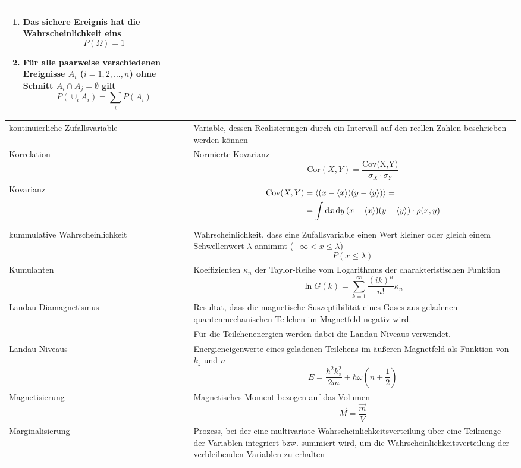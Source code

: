 \documentclass{article}
\newcommand{\diff}{\mathrm{d}}
\newcommand{\lr}[1]{\left(#1\right)}
\begin{document}
\begin{xltabular}{\linewidth}{p{6cm}|X}
{\begin{enumerate}
			\item Das sichere Ereignis hat die Wahrscheinlichkeit eins
				$$P(\Omega) = 1$$

			\item Für alle paarweise verschiedenen Ereignisse $A_i$ ($i=1,2,...,n$) ohne Schnitt $A_i \cap A_j = \emptyset$ gilt
				$$P\lr{ \cup_{i} A_i } = \sum_i P(A_i)$$
		\end{enumerate}} \\
	\hline
		kontinuierliche Zufallsvariable & Variable, dessen Realisierungen durch ein Intervall auf den reellen Zahlen beschrieben werden können \\
	\hline
		Korrelation & Normierte Kovarianz
			$$\text{Cor}(X,Y) = \frac{\text{Cov(X,Y)}}{\sigma_X \cdot \sigma_Y}$$ \\
	\hline
		Kovarianz & 
		{\begin{align*}
			\text{Cov}(X,Y) &= \braket{ (x-\braket{x})(y - \braket{y}) } = \\
			&= \int \diff x\, \diff y\, (x - \braket{x})(y - \braket{y}) \cdot \rho(x,y)
		\end{align*}} \\
	\hline
		kummulative Wahrscheinlichkeit & Wahrscheinlichkeit, dass eine Zufallsvariable einen Wert kleiner oder gleich einem Schwellenwert $\lambda$ annimmt ($-\infty < x \leq \lambda$) 
			$$P(x\leq \lambda)$$ \\
	\hline
		Kumulanten & Koeffizienten $\kappa_n$ der Taylor-Reihe vom Logarithmus der charakteristischen Funktion
			$$\ln G(k) = \sum_{k=1}^\infty \frac{(ik)^n}{n!} \kappa_n $$ 
		 \\
	\hline
		Landau Diamagnetismus & Resultat, dass die magnetische Suszeptibilität eines Gases aus geladenen quantenmechanischen Teilchen im Magnetfeld negativ wird. \\
		& Für die Teilchenenergien werden dabei die Landau-Niveaus verwendet.\\
	\hline
		Landau-Niveaus & Energieneigenwerte eines geladenen Teilchens im äußeren Magnetfeld als Funktion von $k_z$ und $n$
			$$E = \frac{\hbar^2 k_z^2}{2m} + \hbar\omega \lr{ n + \frac{1}{2} }$$ \\
	\hline
		Magnetisierung & Magnetisches Moment bezogen auf das Volumen
			$$\vec{M} = \frac{\vec{m}}{V}$$ \\
	\hline
		Marginalisierung & Prozess, bei der eine multivariate Wahrscheinlichkeitsverteilung über eine Teilmenge der Variablen integriert bzw. summiert wird, um die Wahrscheinlichkeitsverteilung der verbleibenden Variablen zu erhalten

\end{xltabular}
\end{document}
